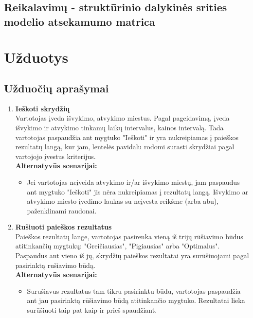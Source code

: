 \documentclass{VUMIFPSkursinis}
\begin{document}
            \subsection{Reikalavimų - struktūrinio dalykinės srities modelio atsekamumo matrica}
      
        \section{Užduotys}
            \subsection{Užduočių aprašymai}
            
                \begin{enumerate}[label=\textbf{U\arabic*}.]

                    \item \textbf{Ieškoti skrydžių}\\
                    Vartotojas įveda išvykimo, atvykimo miestus. Pagal pageidavimą, įveda išvykimo ir atvykimo tinkamų laikų intervalus, kainos intervalą. Tada vartotojas paspaudžia ant mygtuko "Ieškoti" ir yra nukreipiamas į paieškos rezultatų langą, kur jam, lentelės pavidalu rodomi surasti skrydžiai pagal vartojojo įvestus kriterijus.
                    \\\textbf{Alternatyvūs scenarijai:}
                    \begin{itemize}
                        \item Jei vartotojas neįveida atvykimo ir/ar išvykimo miestų, jam paspaudus ant mygtuko "Ieškoti" jis nėra nukreipiamas į rezultatų langą. Išvykimo ar atvykimo miesto įvedimo laukas su neįvesta reikšme (arba abu), paženklinami raudonai.
                    \end{itemize}

                    \item \textbf{Rušiuoti paieškos rezultatus}\\
                    Paieškos rezultatų lange, vartotojas pasirenka vieną iš trijų rūšiavimo būdus atitinkančių mygtukų: "Greičiausias", "Pigiausias" arba "Optimalus". Paspaudus ant vieno iš jų, skrydžių paieškos rezultatai yra surūšiuojami pagal pasirinktą rušiavimo būdą.
                    \\\textbf{Alternatyvūs scenarijai:}
                    \begin{itemize}
                        \item Surušiavus rezultatus tam tikru pasirinktu būdu, vartotojas paspaudžia ant jau pasirinktą rūšiavimo būdą atitinkančio mygtuko. Rezultatai lieka surūšiuoti taip pat kaip ir prieš spaudžiant. 
                    \end{itemize}


\end{enumerate}
\end{document}
